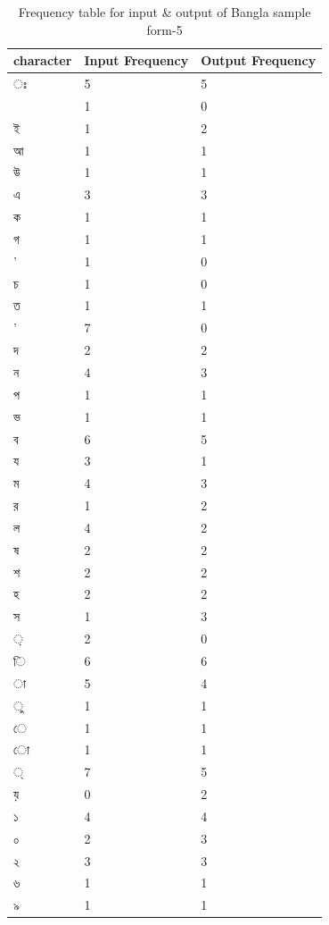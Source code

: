 \begin{table}[H]
\centering
\begin{tabular}{|p{2cm}|p{2cm}|p{2cm}|}
\hline
character & Input Frequency & Output Frequency \\
\hline
{\bengalifont ঃ} & 5 & 5\\
\hline
{\bengalifont 0} & 1 & 0\\
\hline
{\bengalifont ই} & 1 & 2\\
\hline
{\bengalifont আ} & 1 & 1\\
\hline
{\bengalifont উ} & 1 & 1\\
\hline
{\bengalifont এ} & 3 & 3\\
\hline
{\bengalifont ক} & 1 & 1\\
\hline
{\bengalifont গ} & 1 & 1\\
\hline
{\bengalifont ’} & 1 & 0\\
\hline
{\bengalifont চ} & 1 & 0\\
\hline
{\bengalifont ত} & 1 & 1\\
\hline
{\bengalifont '} & 7 & 0\\
\hline
{\bengalifont দ} & 2 & 2\\
\hline
{\bengalifont ন} & 4 & 3\\
\hline
{\bengalifont প} & 1 & 1\\
\hline
{\bengalifont ভ} & 1 & 1\\
\hline
{\bengalifont ব} & 6 & 5\\
\hline
{\bengalifont য} & 3 & 1\\
\hline
{\bengalifont ম} & 4 & 3\\
\hline
{\bengalifont র} & 1 & 2\\
\hline
{\bengalifont ল} & 4 & 2\\
\hline
{\bengalifont ষ} & 2 & 2\\
\hline
{\bengalifont শ} & 2 & 2\\
\hline
{\bengalifont হ} & 2 & 2\\
\hline
{\bengalifont স} & 1 & 3\\
\hline
{\bengalifont ়} & 2 & 0\\
\hline
{\bengalifont ি} & 6 & 6\\
\hline
{\bengalifont া} & 5 & 4\\
\hline
{\bengalifont ু} & 1 & 1\\
\hline
{\bengalifont ে} & 1 & 1\\
\hline
{\bengalifont ো} & 1 & 1\\
\hline
{\bengalifont ্} & 7 & 5\\
\hline
{\bengalifont য়} & 0 & 2\\
\hline
{\bengalifont ১} & 4 & 4\\
\hline
{\bengalifont ০} & 2 & 3\\
\hline
{\bengalifont ২} & 3 & 3\\
\hline
{\bengalifont ৬} & 1 & 1\\
\hline
{\bengalifont ৯} & 1 & 1\\
\hline
\end{tabular}
\caption {Frequency table for input \& output of Bangla sample form-5}
\label {tab:BTable5}
\end{table}

